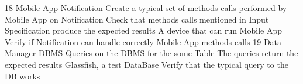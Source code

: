 \testCase
	{18}
	{Mobile App}
	{Notification}
	{Create a typical set of methods calls performed by Mobile App on Notification}
	{Check that methods calls mentioned in Input Specification produce the expected results}
	{A device that can run Mobile App}
	{Verify  if Notification can handle correctly Mobile App methods calls}
\testCase
	{19}
	{Data Manager}
	{DBMS}
	{Queries on the DBMS for the some Table }
	{The queries return the expected results}
	{Glassfish, a test DataBase}
	{Verify that the typical query to the DB works}